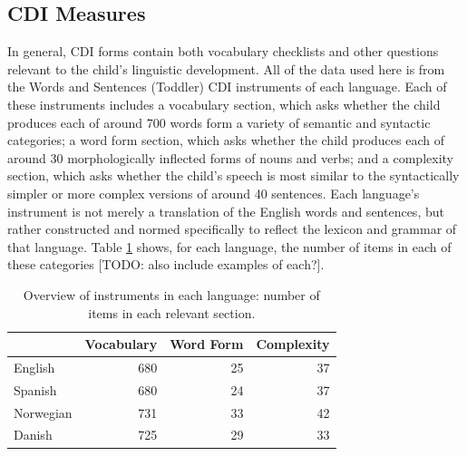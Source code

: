 \documentclass[10pt,letterpaper]{article}
\begin{document}

\subsection{CDI Measures}

In general, CDI forms contain both vocabulary checklists and other questions relevant to the child's linguistic development. All of the data used here is from the Words and Sentences (Toddler) CDI instruments of each language. Each of these instruments includes a vocabulary section, which asks whether the child produces each of around 700 words form a variety of semantic and syntactic categories; a word form section, which asks whether the child produces each of around 30 morphologically inflected forms of nouns and verbs; and a complexity section, which asks whether the child's speech is most similar to the syntactically simpler or more complex versions of around 40 sentences. Each language's instrument is not merely a translation of the English words and sentences, but rather constructed and normed specifically to reflect the lexicon and grammar of that language. Table \ref{table:measures} shows, for each language, the number of items in each of these categories [TODO: also include examples of each?].

\begin{table}[b]
\begin{center}
\begin{tabular}{| l | r | r | r |}
\hline
& Vocabulary & Word Form & Complexity\\ \hline
English & 680 & 25 & 37\\ \hline
Spanish & 680 & 24 & 37\\ \hline
Norwegian & 731 & 33 & 42\\ \hline
Danish & 725 & 29 & 33\\ \hline
\end{tabular}
\caption{\label{table:measures} Overview of instruments in each language: number of items in each relevant section.}
\end{center}
\end{table}
\end{document}
